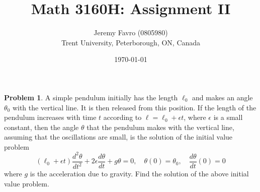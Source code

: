 \documentclass[10pt]{article}
\title{Math 3160H: Assignment II}
\author{Jeremy Favro (0805980) \\ Trent University, Peterborough, ON, Canada}
\date{\today}
\theoremstyle{definition}
\newtheorem{problem}{Problem}
\begin{document}
\maketitle

\begin{problem}
A simple pendulum initially has the length $\ell_0$ and makes an angle $\theta_0$ with the vertical line. It is
then released from this position. If the length of the pendulum increases with time $t$ according to
$\ell=\ell_0+\epsilon t$, where $\epsilon$ is a small constant, then the angle $\theta$ that the pendulum makes with the vertical
line, assuming that the oscillations are small, is the solution of the initial value problem
$$\left(\ell_0+\epsilon t\right)\frac{d^2\theta}{dt^2}+2\epsilon\frac{d\theta}{dt}+g\theta=0,\quad \theta(0)=\theta_0,\quad \frac{d\theta}{dt}(0)=0$$
where $g$ is the acceleration due to gravity. Find the solution of the above initial value problem.
\end{problem}
\end{document}
